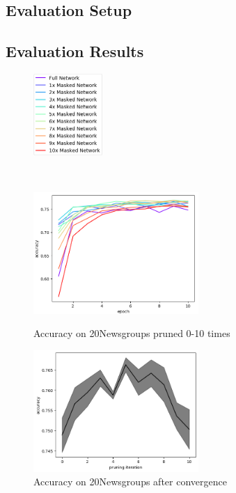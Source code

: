 \subsection*{Evaluation Setup}
\subsection*{Evaluation Results}
\begin{figure}
	\begin{minipage}{0.5\textwidth}
		\centering
		\includegraphics[width=100px]{gfx/7-Evaluation/20Newsgroups_legend.png}
	\end{minipage}
	\begin{minipage}{0.5\textwidth}
		\centering
	\end{minipage}
	\\
	\begin{minipage}{0.5\textwidth}
		\centering
		\includegraphics[height=175px]{gfx/Experiments/Transfer-20Newsgroups-CNN/accuracy/10_iterations.png}
		\caption*{Accuracy on 20Newsgroups pruned 0-10 times}
		\label{fig:CIFAR10accuracy15}
	\end{minipage}\hfill
	\begin{minipage}{0.5\textwidth}
		\centering
		\includegraphics[height=175px]{gfx/Experiments/Transfer-20Newsgroups-CNN/accuracy/converged.png}
		\caption*{Accuracy on 20Newsgroups after convergence}
		\label{?}
	\end{minipage}
\end{figure}

